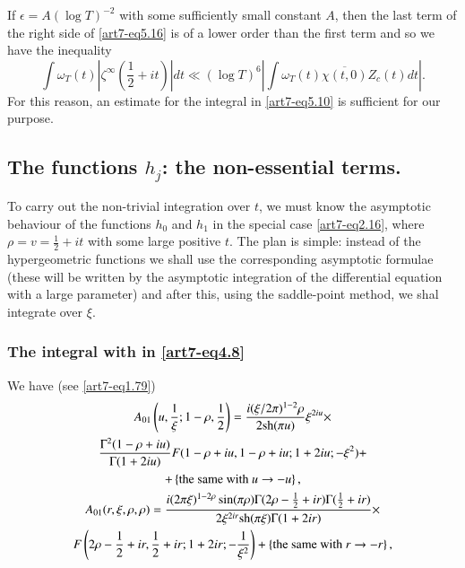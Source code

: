 If $\epsilon = A(\log T)^{-2}$ with some sufficiently small constant $A$, then the last term of the right side of \eqref{art7-eq5.16} is of a lower order than the first term and so we have the inequality
\begin{equation}
\int \omega_T (t) |\zeta^\infty(\frac{1}{2} + it)| dt \ll (\log T)^6 |\int \omega_T (t) \overline{\chi (t, 0)} Z_c (t) dt|. \label{art7-eq5.17}
\end{equation}
For this reason, an estimate for the integral in \eqref{art7-eq5.10} is sufficient for our purpose.

\setcounter{section}{2}
\subsection{The functions $h_j$: the non-essential terms.}\label{art7-subsec2.5}
To carry out the non-trivial integration over $t$, we must know the asymptotic behaviour of the functions $h_0$ and $h_1$ in the special case \eqref{art7-eq2.16}, where $\rho = v = \frac{1}{2} + it$ with some large positive $t$. The plan is simple: instead of the hypergeometric functions we shall use the corresponding asymptotic formulae (these will be written by the asymptotic integration of the differential equation with a large parameter) and after this, using the saddle-point method, we shal integrate over $\xi$.

\subsubsection{The integral with in \eqref{art7-eq4.8}}\label{art7-subsubsec2.5.1}\pageoriginale

\setcounter{section}{6}
\setcounter{equation}{0}
We have (see \eqref{art7-eq1.79})
\begin{gather}
A_{01} \left(u, \frac{1}{\xi}; 1 - \rho, \frac{1}{2} \right) = \frac{i(\xi/ 2 \pi)^{1-2} \rho}{2 \text{sh} (\pi u)} \xi^{2 i u} \times \label{art7-eq6.1}\\
\frac{\Gamma^2 (1-\rho + iu)}{\Gamma (1+ 2 iu)} F (1- \rho + iu, 1 - \rho + i u ; 1 + 2 i u ; - \xi^2) + \notag\\
+ \left\{\text{the same with } u \to -u \right\}, \notag\\
A_{01} (r, \xi, \rho, \rho) = \frac{i(2 \pi \xi)^{1-2\rho} \sin (\pi \rho) \Gamma (2 \rho - \frac{1}{2} + ir) \Gamma (\frac{1}{2} + ir)}{2 \xi^{2ir} \text{sh} (\pi \xi) \Gamma (1+ 2 ir)}  \times \label{art7-eq6.2}\\
F \left(2 \rho - \frac{1}{2} + ir , \frac{1}{2} + ir; 1 + 2 ir; -\frac{1}{\xi^2} \right) + \left\{\text{the same with } r \to - r \right\}, \notag
\end{gather}

